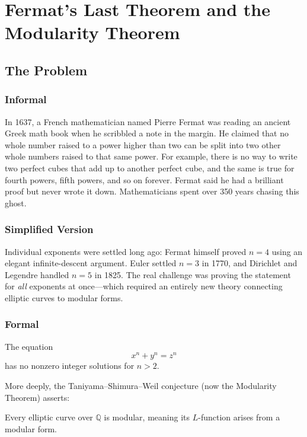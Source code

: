 \let\LocalMacro\relax

\chapter{Fermat's Last Theorem and the Modularity Theorem}

\section{The Problem}

\subsection{Informal}
In 1637, a French mathematician named Pierre Fermat was reading an ancient Greek math book when he scribbled a note in the margin. He claimed that no whole number raised to a power higher than two can be split into two other whole numbers raised to that same power. For example, there is no way to write two perfect cubes that add up to another perfect cube, and the same is true for fourth powers, fifth powers, and so on forever. Fermat said he had a brilliant proof but never wrote it down. Mathematicians spent over 350 years chasing this ghost.

\subsection{Simplified Version}
Individual exponents were settled long ago: Fermat himself proved $n=4$ using an elegant infinite-descent argument. Euler settled $n=3$ in 1770, and Dirichlet and Legendre handled $n=5$ in 1825. The real challenge was proving the statement for \emph{all} exponents at once---which required an entirely new theory connecting elliptic curves to modular forms.

\subsection{Formal}
The equation
\begin{equation}
x^n + y^n = z^n
\end{equation}
has no nonzero integer solutions for $n > 2$.

More deeply, the Taniyama--Shimura--Weil conjecture (now the Modularity Theorem) asserts:

\begin{conjecture}
Every elliptic curve over $\mathbb{Q}$ is modular, meaning its $L$-function arises from a modular form.
\end{conjecture}

